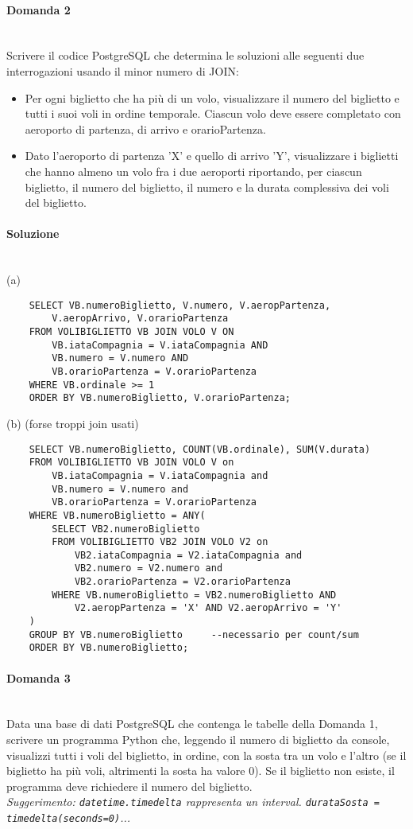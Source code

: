 \documentclass[a4paper, 10pt, titlepage]{article}
\begin{document}
\paragraph{Domanda 2}\dotfill
\\Scrivere il codice PostgreSQL che determina le soluzioni alle seguenti due interrogazioni usando il minor numero di JOIN:
\begin{itemize}
\item[(a)] Per ogni biglietto che ha più di un volo, visualizzare il numero del biglietto e tutti i suoi voli in ordine temporale. Ciascun volo deve essere completato con aeroporto di partenza, di arrivo e orarioPartenza.
\item[(b)] Dato l'aeroporto di partenza 'X' e quello di arrivo 'Y', visualizzare i biglietti che hanno almeno un volo fra i due aeroporti riportando, per ciascun biglietto, il numero del biglietto, il numero e la durata complessiva dei voli del biglietto.
\end{itemize}

\paragraph{Soluzione}\dotfill
\\(a) 
\begin{lstlisting}
	SELECT VB.numeroBiglietto, V.numero, V.aeropPartenza,
		V.aeropArrivo, V.orarioPartenza
	FROM VOLIBIGLIETTO VB JOIN VOLO V ON 
		VB.iataCompagnia = V.iataCompagnia AND 
		VB.numero = V.numero AND 
		VB.orarioPartenza = V.orarioPartenza
	WHERE VB.ordinale >= 1
	ORDER BY VB.numeroBiglietto, V.orarioPartenza;
\end{lstlisting}
(b) (forse troppi join usati)
\begin{lstlisting}
	SELECT VB.numeroBiglietto, COUNT(VB.ordinale), SUM(V.durata)
	FROM VOLIBIGLIETTO VB JOIN VOLO V on
 	 	VB.iataCompagnia = V.iataCompagnia and
 		VB.numero = V.numero and
 		VB.orarioPartenza = V.orarioPartenza
	WHERE VB.numeroBiglietto = ANY(
  		SELECT VB2.numeroBiglietto
  		FROM VOLIBIGLIETTO VB2 JOIN VOLO V2 on
    		VB2.iataCompagnia = V2.iataCompagnia and
    		VB2.numero = V2.numero and
    		VB2.orarioPartenza = V2.orarioPartenza
  		WHERE VB.numeroBiglietto = VB2.numeroBiglietto AND
        	V2.aeropPartenza = 'X' AND V2.aeropArrivo = 'Y'
  	)
	GROUP BY VB.numeroBiglietto		--necessario per count/sum
	ORDER BY VB.numeroBiglietto;
\end{lstlisting}

\paragraph{Domanda 3}\dotfill
\\Data una base di dati PostgreSQL che contenga le tabelle della Domanda 1, scrivere un programma Python che, leggendo il numero di biglietto da console, visualizzi tutti i voli del biglietto, in ordine, con la sosta tra un volo e l'altro (se il biglietto ha più voli, altrimenti la sosta ha valore 0). Se il biglietto non esiste, il programma deve richiedere il numero del biglietto.\\
{\small \textit{Suggerimento: \lstinline|datetime.timedelta| rappresenta un interval. \lstinline|durataSosta = timedelta(seconds=0)|...} }
\end{document}
